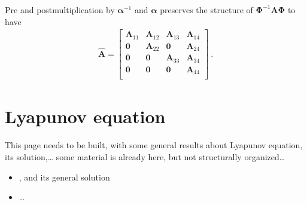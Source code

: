 \documentclass[letterpaper,10pt,english]{jupyterBook}
\begin{document}
\sphinxAtStartPar
Pre\sphinxhyphen{} and post\sphinxhyphen{}multiplication by \(\boldsymbol\alpha^{-1}\) and \(\boldsymbol\alpha\) preserves the structure of \(\boldsymbol\Phi^{-1} \mathbf{A} \boldsymbol\Phi\) to have
\begin{equation*}
\begin{split}
\hat{\mathbf{A}} = 
\begin{bmatrix} 
   \mathbf{A}_{11} & \mathbf{A}_{12} & \mathbf{A}_{13} & \mathbf{A}_{14} \\ 
   \mathbf{0}      & \mathbf{A}_{22} & \mathbf{0}      & \mathbf{A}_{24} \\ 
   \mathbf{0}      & \mathbf{0}      & \mathbf{A}_{33} & \mathbf{A}_{34} \\ 
   \mathbf{0}      & \mathbf{0}      & \mathbf{0}      & \mathbf{A}_{44} \\ 
\end{bmatrix} \ .
\end{split}
\end{equation*}


\sphinxstepscope


\chapter{Lyapunov equation}
\label{\detokenize{ch/system-theory/lyapunov-equation:lyapunov-equation}}\label{\detokenize{ch/system-theory/lyapunov-equation:lyapunov-eq}}\label{\detokenize{ch/system-theory/lyapunov-equation::doc}}
\sphinxAtStartPar
This page needs to be built, with some general results about Lyapunov equation, its solution,… some material is already here, but not structurally organized…

\sphinxAtStartPar
{}
\begin{itemize}
\item {} 
\sphinxAtStartPar
{\hyperref[\detokenize{ch/ode/ode-linear-systems:ode-linear-miscellanea-stochastic-response-correlation-matrix-lyapunov}]{}}, and its general solution

\item {} 
\sphinxAtStartPar
…

\end{itemize}
\end{document}
